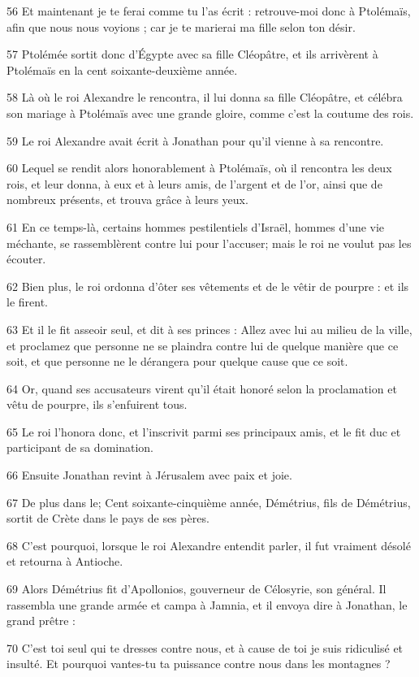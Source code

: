 \par 56 Et maintenant je te ferai comme tu l'as écrit : retrouve-moi donc à Ptolémaïs, afin que nous nous voyions ; car je te marierai ma fille selon ton désir.
\par 57 Ptolémée sortit donc d'Égypte avec sa fille Cléopâtre, et ils arrivèrent à Ptolémaïs en la cent soixante-deuxième année.
\par 58 Là où le roi Alexandre le rencontra, il lui donna sa fille Cléopâtre, et célébra son mariage à Ptolémaïs avec une grande gloire, comme c'est la coutume des rois.
\par 59 Le roi Alexandre avait écrit à Jonathan pour qu'il vienne à sa rencontre.
\par 60 Lequel se rendit alors honorablement à Ptolémaïs, où il rencontra les deux rois, et leur donna, à eux et à leurs amis, de l'argent et de l'or, ainsi que de nombreux présents, et trouva grâce à leurs yeux.
\par 61 En ce temps-là, certains hommes pestilentiels d'Israël, hommes d'une vie méchante, se rassemblèrent contre lui pour l'accuser; mais le roi ne voulut pas les écouter.
\par 62 Bien plus, le roi ordonna d'ôter ses vêtements et de le vêtir de pourpre : et ils le firent.
\par 63 Et il le fit asseoir seul, et dit à ses princes : Allez avec lui au milieu de la ville, et proclamez que personne ne se plaindra contre lui de quelque manière que ce soit, et que personne ne le dérangera pour quelque cause que ce soit.
\par 64 Or, quand ses accusateurs virent qu'il était honoré selon la proclamation et vêtu de pourpre, ils s'enfuirent tous.
\par 65 Le roi l'honora donc, et l'inscrivit parmi ses principaux amis, et le fit duc et participant de sa domination.
\par 66 Ensuite Jonathan revint à Jérusalem avec paix et joie.
\par 67 De plus dans le; Cent soixante-cinquième année, Démétrius, fils de Démétrius, sortit de Crète dans le pays de ses pères.
\par 68 C'est pourquoi, lorsque le roi Alexandre entendit parler, il fut vraiment désolé et retourna à Antioche.
\par 69 Alors Démétrius fit d'Apollonios, gouverneur de Célosyrie, son général. Il rassembla une grande armée et campa à Jamnia, et il envoya dire à Jonathan, le grand prêtre :
\par 70 C'est toi seul qui te dresses contre nous, et à cause de toi je suis ridiculisé et insulté. Et pourquoi vantes-tu ta puissance contre nous dans les montagnes ?
